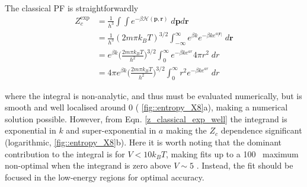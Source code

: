 \documentclass[../main.tex]{subfiles}
\begin{document}
The classical PF is straightforwardly
\begin{equation}
\begin{aligned}
Z_c^\text{exp} &= \frac{1}{h^3}\int\int e^{-\beta \mathcal{H}(\boldsymbol{p}, \boldsymbol{r})} \; d\boldsymbol{p} d\boldsymbol{r} \\
&=  \frac{1}{h^3} (2m\pi k_B T)^{3/2}  \int_{-\infty}^\infty e^{\beta k}e^{-\beta k e^{a|\boldsymbol{r}|}} \;  d\boldsymbol{r} \\
&=   e^{\beta k}{\Big (} \frac{2m\pi k_B T}{h^2} {\Big )}^{3/2}  \int_{0}^\infty e^{-\beta k e^{a{r}}} 4\pi r^2\;  d{r} \\
&=  4\pi  e^{\beta k}{\Big (} \frac{2m\pi k_B T}{h^2} {\Big )}^{3/2}  \int_{0}^\infty r^2 e^{-\beta k e^{a{r}}} \;  d{r}
\end{aligned}
\label{z_classical_exp_well}
\end{equation}

where the integral is non-analytic, and thus must be evaluated numerically, but is smooth and well localised around 0 (\figurename{ \ref{fig::entropy_X8}}a), making a numerical solution possible. However, from Eqn. \eqref{z_classical_exp_well} the integrand is exponential in $k$ and super-exponential in $a$ making the $Z_c$ dependence significant (logarithmic, \figurename{ \ref{fig::entropy_X8}}b). Here it is worth noting that the dominant contribution to the integral is for $V < 10k_B T$, making fits up to a 100 \kcal $\,$ maximum non-optimal when the integrand is zero above $V \sim 5$ \kcal. Instead, the fit should be focused in the low-energy regions for optimal accuracy.
\end{document}
